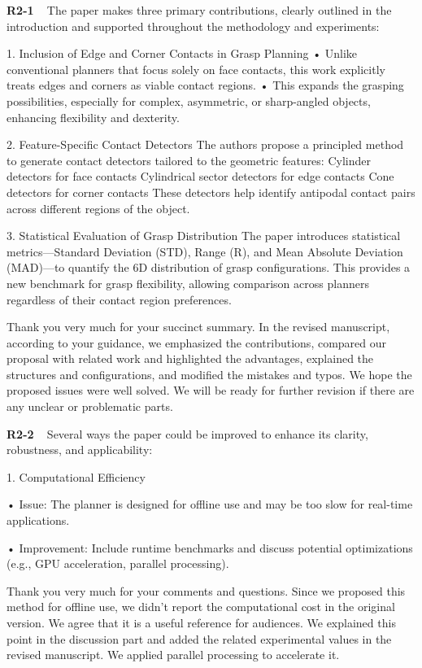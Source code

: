 \documentclass[journal]{IEEEtran}
\begin{document}
\noindent
{\textbf{\color{black}R2-1 }\color{gray}~
The paper makes three primary contributions, clearly outlined in the introduction and supported throughout the methodology and experiments:

1. Inclusion of Edge and Corner Contacts in Grasp Planning
• Unlike conventional planners that focus solely on face contacts, this work explicitly treats edges and corners as viable contact regions.
• This expands the grasping possibilities, especially for complex, asymmetric, or sharp-angled objects, enhancing flexibility and dexterity.

2. Feature-Specific Contact Detectors
The authors propose a principled method to generate contact detectors tailored to the geometric features:
Cylinder detectors for face contacts
Cylindrical sector detectors for edge contacts
Cone detectors for corner contacts
These detectors help identify antipodal contact pairs across different regions of the object.

3. Statistical Evaluation of Grasp Distribution
The paper introduces statistical metrics—Standard Deviation (STD), Range (R), and Mean Absolute Deviation (MAD)—to quantify the 6D distribution of grasp configurations.
This provides a new benchmark for grasp flexibility, allowing comparison across planners regardless of their contact region preferences.
}

Thank you very much for your succinct summary. In the revised manuscript, according to your guidance, we emphasized the contributions, compared our proposal with related work and highlighted the advantages, explained the structures and configurations, and modified the mistakes and typos. We hope the proposed issues were well solved. We will be ready for further revision if there are any unclear or problematic parts.
\bigskip

\noindent
{\textbf{\color{black}R2-2 }\color{gray}~
Several ways the paper could be improved to enhance its clarity, robustness, and applicability:

1. Computational Efficiency

• Issue: The planner is designed for offline use and may be too slow for real-time applications.

• Improvement: Include runtime benchmarks and discuss potential optimizations (e.g., GPU acceleration, parallel processing).
}

Thank you very much for your comments and questions. Since we proposed this method for offline use, we didn't report the computational cost in the original version. We agree that it is a useful reference for audiences. We explained this point in the discussion part and added the related experimental values in the revised manuscript. We applied parallel processing to accelerate it. 
\end{document}
